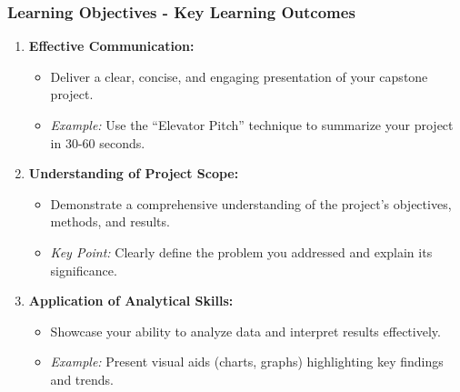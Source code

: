 \documentclass[aspectratio=169]{beamer}
\begin{document}
\begin{frame}[fragile]
    \frametitle{Learning Objectives - Key Learning Outcomes}
    \begin{enumerate}
        \item \textbf{Effective Communication:}
            \begin{itemize}
                \item Deliver a clear, concise, and engaging presentation of your capstone project.
                \item \textit{Example:} Use the “Elevator Pitch” technique to summarize your project in 30-60 seconds.
            \end{itemize}
        
        \item \textbf{Understanding of Project Scope:}
            \begin{itemize}
                \item Demonstrate a comprehensive understanding of the project’s objectives, methods, and results.
                \item \textit{Key Point:} Clearly define the problem you addressed and explain its significance.
            \end{itemize}
        
        \item \textbf{Application of Analytical Skills:}
            \begin{itemize}
                \item Showcase your ability to analyze data and interpret results effectively.
                \item \textit{Example:} Present visual aids (charts, graphs) highlighting key findings and trends.
            \end{itemize}
    \end{enumerate}
\end{frame}
\end{document}
